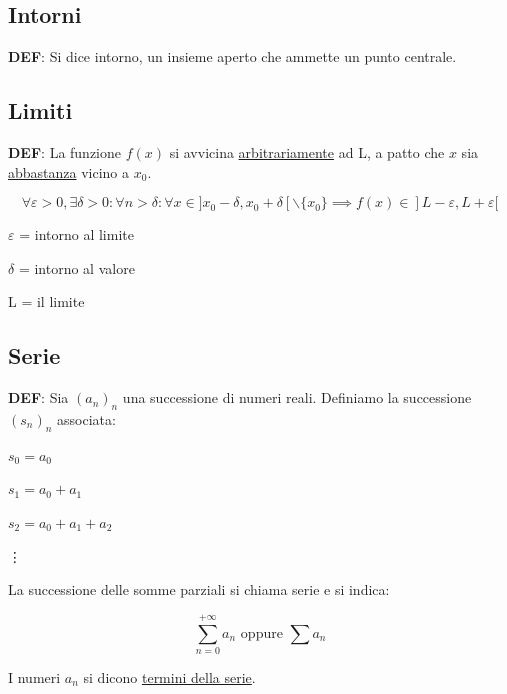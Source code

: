 \documentclass{article}
\begin{document}
\subsection{Intorni}

\textbf{DEF}: Si dice intorno, un insieme aperto che ammette un punto centrale.

\subsection{Limiti}

\textbf{DEF}: La funzione $f(x)$ si avvicina \underline{arbitrariamente}
ad L, a patto che $x$ sia \underline{abbastanza} vicino a $x_0$.

\begin{equation}
    \forall \varepsilon > 0, \exists \delta > 0 :
    \forall n > \delta :
    \forall x \in ] x_0 - \delta, x_0 + \delta [ \backslash \{x_0\}
    \implies f(x) \in ] L - \varepsilon, L + \varepsilon [
\end{equation}

\vspace{5mm}
$\varepsilon$ = intorno al limite

$\delta$ = intorno al valore

L = il limite

\subsection{Serie}

\textbf{DEF}: Sia $(a_n)_n$ una successione di
numeri reali. Definiamo la successione $(s_n)_n$ associata:

\vspace{5mm}
$s_0 = a_0$

\vspace{5mm}
$s_1 = a_0 + a_1$

\vspace{5mm}
$s_2 = a_0 + a_1 + a_2$

\indent
\vdots

\vspace{5mm}
\noindent
La successione delle somme parziali si chiama serie e si indica:

\begin{equation}
    \sum_{n = 0}^{+\infty} a_n \text{ oppure } \sum_{}^{} a_n
\end{equation}

\noindent
I numeri $a_n$ si dicono \underline{termini della serie}.
\end{document}
